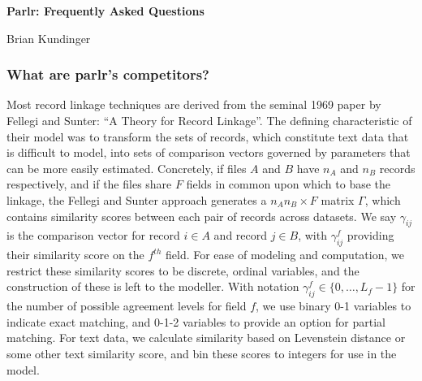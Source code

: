 \documentclass[
  12pt,
]{article}
\author{}
\date{\vspace{-2.5em}}
\begin{document}
\begin{flushright} 
    \end{flushright}
    \begin{center} \textbf{Parlr: Frequently Asked Questions}
    
    Brian Kundinger

    \end{center}

\hypertarget{what-are-parlrs-competitors}{%
\subsubsection{What are parlr's
competitors?}\label{what-are-parlrs-competitors}}

Most record linkage techniques are derived from the seminal 1969 paper
by Fellegi and Sunter: ``A Theory for Record Linkage''. The defining
characteristic of their model was to transform the sets of records,
which constitute text data that is difficult to model, into sets of
comparison vectors governed by parameters that can be more easily
estimated. Concretely, if files \(A\) and \(B\) have \(n_A\) and \(n_B\)
records respectively, and if the files share \(F\) fields in common upon
which to base the linkage, the Fellegi and Sunter approach generates a
\(n_A n_B \times F\) matrix \(\Gamma\), which contains similarity scores
between each pair of records across datasets. We say \(\gamma_{ij}\) is
the comparison vector for record \(i \in A\) and record \(j \in B\),
with \(\gamma_{ij}^f\) providing their similarity score on the
\(f^{th}\) field. For ease of modeling and computation, we restrict
these similarity scores to be discrete, ordinal variables, and the
construction of these is left to the modeller. With notation
\(\gamma_{ij}^f \in \{0, \ldots, L_f - 1\}\) for the number of possible
agreement levels for field \(f\), we use binary 0-1 variables to
indicate exact matching, and 0-1-2 variables to provide an option for
partial matching. For text data, we calculate similarity based on
Levenstein distance or some other text similarity score, and bin these
scores to integers for use in the model.
\end{document}
